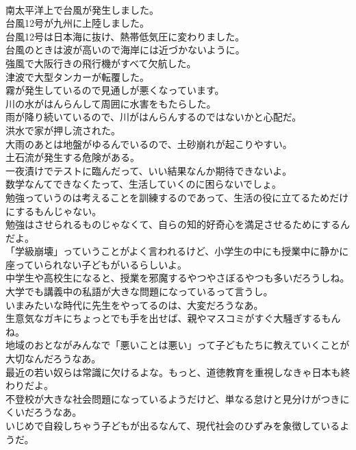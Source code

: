 \documentclass[8pt]{extreport}
\begin{document}
\begin{CJK}{UTF8}{min}
\\	南太平洋上で台風が発生しました。	
\\	台風12号が九州に上陸しました。	
\\	台風12号は日本海に抜け、熱帯低気圧に変わりました。	
\\	台風のときは波が高いので海岸には近づかないように。	
\\	強風で大阪行きの飛行機がすべて欠航した。	
\\	津波で大型タンカーが転覆した。	
\\	霧が発生しているので見通しが悪くなっています。	
\\	川の水がはんらんして周囲に水害をもたらした。	
\\	雨が降り続いているので、川がはんらんするのではないかと心配だ。	
\\	洪水で家が押し流された。	
\\	大雨のあとは地盤がゆるんでいるので、土砂崩れが起こりやすい。	
\\	土石流が発生する危険がある。	
\\	一夜漬けでテストに臨んだって、いい結果なんか期待できないよ。	
\\	数学なんてできなくたって、生活していくのに困らないでしょ。	
\\	勉強っていうのは考えることを訓練するのであって、生活の役に立てるためだけにするもんじゃない。	
\\	勉強はさせられるものじゃなくて、自らの知的好奇心を満足させるためにするんだよ。	
\\	「学級崩壊」っていうことがよく言われるけど、小学生の中にも授業中に静かに座っていられない子どもがいるらしいよ。	
\\	中学生や高校生になると、授業を邪魔するやつやさぼるやつも多いだろうしね。	
\\	大学でも講義中の私語が大きな問題になっているって言うし。	
\\	いまみたいな時代に先生をやってるのは、大変だろうなあ。	
\\	生意気なガキにちょっとでも手を出せば、親やマスコミがすぐ大騒ぎするもんね。	
\\	地域のおとながみんなで「悪いことは悪い」って子どもたちに教えていくことが大切なんだろうなあ。	
\\	最近の若い奴らは常識に欠けるよな。もっと、道徳教育を重視しなきゃ日本も終わりだよ。	
\\	不登校が大きな社会問題になっているようだけど、単なる怠けと見分けがつきにくいだろうなあ。	
\\	いじめで自殺しちゃう子どもが出るなんて、現代社会のひずみを象徴しているようだ。	

\end{CJK}
\end{document}
